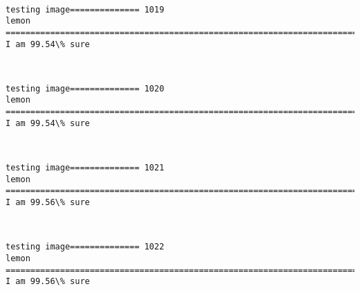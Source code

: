 \documentclass[11pt]{article}
\begin{document}
    \begin{center}
    \end{center}
    { \hspace*{\fill} \\}
    
    \begin{Verbatim}[commandchars=\\\{\}]
testing image============== 1019
lemon
============================================================================
I am 99.54\% sure

    \end{Verbatim}

    \begin{center}
    \end{center}
    { \hspace*{\fill} \\}
    
    \begin{Verbatim}[commandchars=\\\{\}]
testing image============== 1020
lemon
============================================================================
I am 99.54\% sure

    \end{Verbatim}

    \begin{center}
    \end{center}
    { \hspace*{\fill} \\}
    
    \begin{Verbatim}[commandchars=\\\{\}]
testing image============== 1021
lemon
============================================================================
I am 99.56\% sure

    \end{Verbatim}

    \begin{center}
    \end{center}
    { \hspace*{\fill} \\}
    
    \begin{Verbatim}[commandchars=\\\{\}]
testing image============== 1022
lemon
============================================================================
I am 99.56\% sure

    \end{Verbatim}
\end{document}
